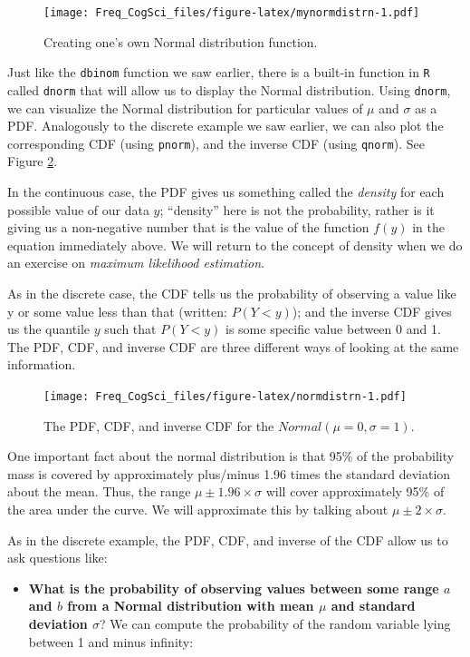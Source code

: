 \documentclass[
  12pt,
]{krantz}
\providecommand{\tightlist}{%
  \setlength{\itemsep}{0pt}\setlength{\parskip}{0pt}}
\theoremstyle{definition}
\theoremstyle{definition}
\theoremstyle{definition}
\theoremstyle{definition}
\theoremstyle{remark}
\begin{document}
\begin{figure}
\centering
\texttt{[image: Freq\_CogSci\_files/figure-latex/mynormdistrn-1.pdf]}
\caption{\label{fig:mynormdistrn}Creating one's own Normal distribution function.}
\end{figure}

Just like the \texttt{dbinom} function we saw earlier, there is a built-in function in \texttt{R} called \texttt{dnorm} that will allow us to display the Normal distribution.
Using \texttt{dnorm}, we can visualize the Normal distribution for particular values of \(\mu\) and \(\sigma\) as a PDF. Analogously to the discrete example we saw earlier, we can also plot the corresponding CDF (using \texttt{pnorm}), and the inverse CDF (using \texttt{qnorm}). See Figure \ref{fig:normdistrn}.

In the continuous case, the PDF gives us something called the \emph{density} for each possible value of our data \(y\); ``density'' here is not the probability, rather is it giving us a non-negative number that is the value of the function \(f(y)\) in the equation immediately above. We will return to the concept of density when we do an exercise on \emph{maximum likelihood estimation}.

As in the discrete case, the CDF tells us the probability of observing a value like y or some value less than that (written: \(P(Y<y)\)); and the inverse CDF gives us the quantile \(y\) such that \(P(Y<y)\) is some specific value between 0 and 1. The PDF, CDF, and inverse CDF are three different ways of looking at the same information.

\begin{figure}
\centering
\texttt{[image: Freq\_CogSci\_files/figure-latex/normdistrn-1.pdf]}
\caption{\label{fig:normdistrn}The PDF, CDF, and inverse CDF for the \(Normal(\mu=0,\sigma=1)\).}
\end{figure}

One important fact about the normal distribution is that 95\% of the probability mass is covered by approximately plus/minus 1.96 times the standard deviation about the mean. Thus, the range \(\mu\pm 1.96\times \sigma\) will cover approximately 95\% of the area under the curve. We will approximate this by talking about \(\mu\pm 2\times \sigma\).

As in the discrete example, the PDF, CDF, and inverse of the CDF allow us to ask questions like:

\begin{itemize}
\tightlist
\item
  \textbf{What is the probability of observing values between some range \(a\) and \(b\) from a Normal distribution with mean \(\mu\) and standard deviation \(\sigma\)}? We can compute the probability of the random variable lying between 1 and minus infinity:
\end{itemize}
\end{document}
